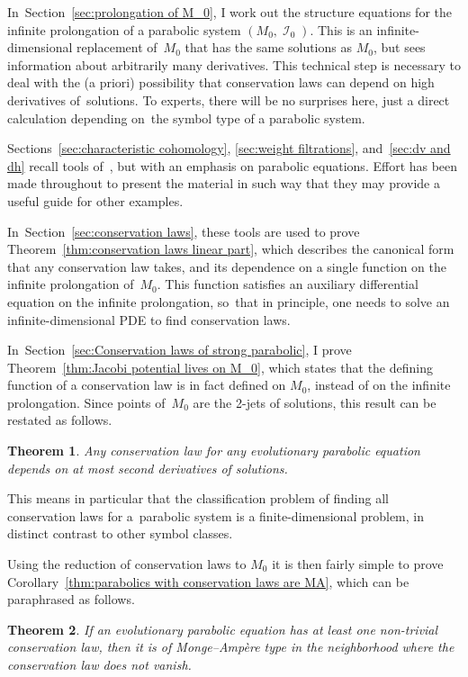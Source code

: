 \documentclass[pdftex]{sigma}
\DeclareMathOperator{\I}{\mathcal{I}}
\numberwithin{equation}{section}
\newtheorem{Theorem}{Theorem}[section]
\begin{document}
In~Section~\ref{sec:prolongation of M_0}, I work out the structure equations for the infinite prolongation of a parabolic system $(M_0,\I_0)$. This is an infinite-dimensional replacement of~$M_0$ that has the same solutions as $M_0$, but sees information about arbitrarily many derivatives. This technical step is necessary to deal with the (a priori) possibility that conservation laws can depend on high derivatives of~solutions. To experts, there will be no surprises here, just a direct calculation depending on~the symbol type of a parabolic system.

Sections~\ref{sec:characteristic cohomology}, \ref{sec:weight filtrations}, and~\ref{sec:dv and dh} recall tools of~\cite{Characteristic_Cohomology_I}, but with an emphasis on parabolic equations.
Effort has been made throughout to present the material in such way that they may provide a useful guide for other examples.

In~Section~\ref{sec:conservation laws}, these tools are used to prove Theorem~\ref{thm:conservation laws linear part}, which describes the canonical form that any conservation law takes, and its dependence on a single function on the infinite prolongation of~$M_0$. This function satisfies an auxiliary differential equation on the infinite prolongation, so~that in principle, one needs to solve an infinite-dimensional PDE to find conservation laws.

In~Section~\ref{sec:Conservation laws of strong parabolic}, I prove
Theorem~\ref{thm:Jacobi potential lives on M_0}, which states that the defining function of a conservation law is in fact defined on $M_0$, instead of on the infinite prolongation. Since points of~$M_0$ are the 2-jets of solutions, this result can be restated as follows.
\begin{Theorem}
 Any conservation law for any evolutionary parabolic equation depends on at most second derivatives of solutions.
\end{Theorem}
This means in particular that the classification problem of finding all conservation laws for a~parabolic system is a finite-dimensional problem, in distinct contrast to other symbol classes.

Using the reduction of conservation laws to $M_0$ it is then fairly simple to prove Corollary~\ref{thm:parabolics with conservation laws are MA}, which can be paraphrased as follows.
\begin{Theorem}
 If an evolutionary parabolic equation has at least one non-trivial conservation law, then it is of Monge--Amp\`ere type in the neighborhood where the conservation law does not vanish.
\end{Theorem}
\end{document}
